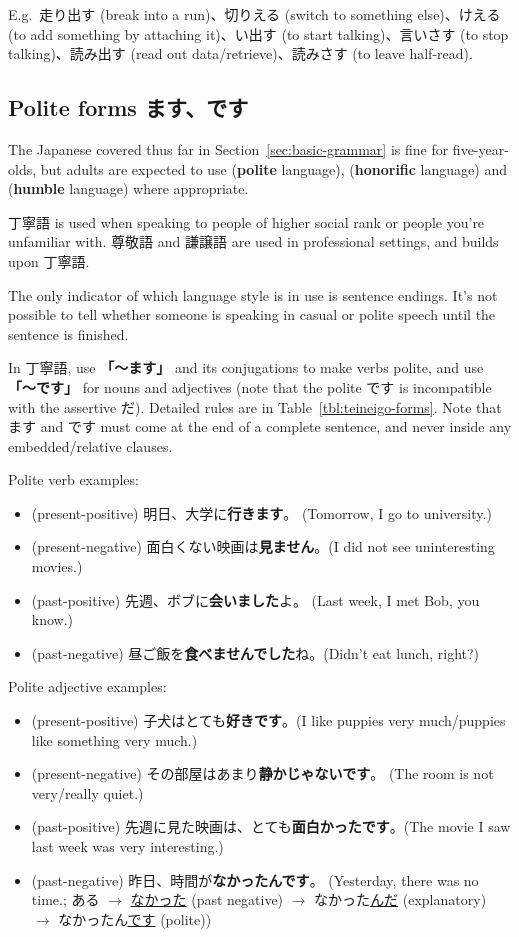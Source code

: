 \documentclass[../nihongo-gakushuu-kyouzai.tex]{subfiles}
\begin{document}
E.g.\ 走り出す (break into a run)、切りえる (switch to something else)、けえる (to add something by attaching it)、い出す (to start talking)、言いさす (to stop talking)、読み出す (read out data/retrieve)、読みさす (to leave half-read).


\subsection{Polite forms ます、です}

The Japanese covered thus far in Section~\ref{sec:basic-grammar} is fine for five-year-olds, but adults are expected to use  (\textbf{polite} language),  (\textbf{honorific} language) and  (\textbf{humble} language) where appropriate.

丁寧語 is used when speaking to people of higher social rank or people you're unfamiliar with. 尊敬語 and 謙譲語 are used in professional settings, and builds upon 丁寧語.

The only indicator of which language style is in use is sentence endings. It's not possible to tell whether someone is speaking in casual or polite speech until the sentence is finished.

In 丁寧語, use \textbf{「〜ます」} and its conjugations to make verbs polite, and use \textbf{「〜です」} for nouns and adjectives (note that the polite です is incompatible with the assertive だ). Detailed rules are in Table~\ref{tbl:teineigo-forms}. Note that ます and です must come at the end of a complete sentence, and never inside any embedded/relative clauses.

Polite verb examples:
\begin{itemize}
    \item (present-positive) 明日、大学に\textbf{行きます}。 (Tomorrow, I go to university.)
    \item (present-negative) 面白くない映画は\textbf{見ません}。(I did not see uninteresting movies.)
    \item (past-positive) 先週、ボブに\textbf{会いました}よ。 (Last week, I met Bob, you know.)
    \item (past-negative) 昼ご飯を\textbf{食べませんでした}ね。(Didn't eat lunch, right?)
\end{itemize}

Polite adjective examples:
\begin{itemize}
    \item (present-positive) 子犬はとても\textbf{好きです}。(I like puppies very much/puppies like something very much.)
    \item (present-negative) その部屋はあまり\textbf{静かじゃないです}。 (The room is not very/really quiet.)
    \item (past-positive) 先週に見た映画は、とても\textbf{面白かったです}。(The movie I saw last week was very interesting.)
    \item (past-negative) 昨日、時間が\textbf{なかったんです}。 (Yesterday, there was no time.; ある $\to$ \ul{なかった} (past negative) $\to$ なかった\ul{んだ} (explanatory) $\to$ なかったん\ul{です} (polite))
\end{itemize}
\end{document}
